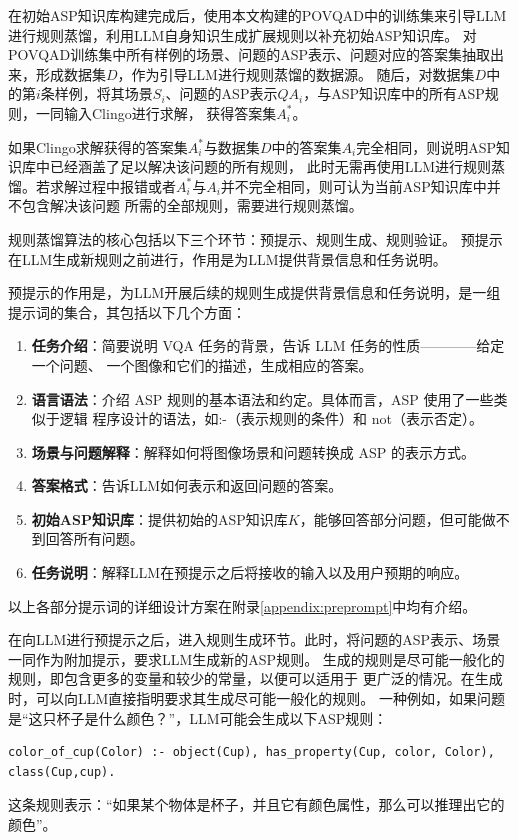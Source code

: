 在初始ASP知识库构建完成后，使用本文构建的POVQAD中的训练集来引导LLM进行规则蒸馏，利用LLM自身知识生成扩展规则以补充初始ASP知识库。
对POVQAD训练集中所有样例的场景、问题的ASP表示、问题对应的答案集抽取出来，形成数据集$D$，作为引导LLM进行规则蒸馏的数据源。
随后，对数据集$D$中的第$i$条样例，将其场景$S_i$、问题的ASP表示$QA_i$，与ASP知识库中的所有ASP规则，一同输入Clingo进行求解，
获得答案集$A^*_i$。

如果Clingo求解获得的答案集$A^*_i$与数据集$D$中的答案集$A_i$完全相同，则说明ASP知识库中已经涵盖了足以解决该问题的所有规则，
此时无需再使用LLM进行规则蒸馏。若求解过程中报错或者$A^*_i$与$A_i$并不完全相同，则可认为当前ASP知识库中并不包含解决该问题
所需的全部规则，需要进行规则蒸馏。

规则蒸馏算法的核心包括以下三个环节：预提示、规则生成、规则验证。
预提示在LLM生成新规则之前进行，作用是为LLM提供背景信息和任务说明。

预提示的作用是，为LLM开展后续的规则生成提供背景信息和任务说明，是一组提示词的集合，其包括以下几个方面：
\begin{enumerate}[nosep]
\item \textbf{任务介绍}：简要说明 VQA 任务的背景，告诉 LLM 任务的性质————给定一个问题、
一个图像和它们的描述，生成相应的答案。
\item \textbf{语言语法}：介绍 ASP 规则的基本语法和约定。具体而言，ASP 使用了一些类似于逻辑
程序设计的语法，如:-（表示规则的条件）和 not（表示否定）。
\item \textbf{场景与问题解释}：解释如何将图像场景和问题转换成 ASP 的表示方式。
\item \textbf{答案格式}：告诉LLM如何表示和返回问题的答案。
\item \textbf{初始ASP知识库}：提供初始的ASP知识库$K$，能够回答部分问题，但可能做不到回答所有问题。
\item \textbf{任务说明}：解释LLM在预提示之后将接收的输入以及用户预期的响应。
\end{enumerate}
以上各部分提示词的详细设计方案在附录\ref{appendix:preprompt}中均有介绍。

在向LLM进行预提示之后，进入规则生成环节。此时，将问题的ASP表示、场景一同作为附加提示，要求LLM生成新的ASP规则。
生成的规则是尽可能一般化的规则，即包含更多的变量和较少的常量，以便可以适用于
更广泛的情况。在生成时，可以向LLM直接指明要求其生成尽可能一般化的规则。
一种例如，如果问题是“这只杯子是什么颜色？”，LLM可能会生成以下ASP规则：
\begin{lstlisting}
color_of_cup(Color) :- object(Cup), has_property(Cup, color, Color), class(Cup,cup).
\end{lstlisting}
这条规则表示：“如果某个物体是杯子，并且它有颜色属性，那么可以推理出它的颜色”。


